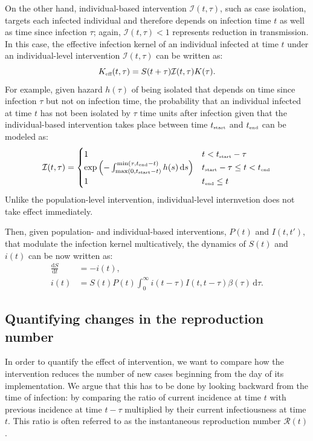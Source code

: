 \documentclass[12pt]{article}
\newcommand{\RR}{\ensuremath{{\mathcal R}}\xspace}
\newcommand{\tsub}[2]{#1_{{\textrm{\tiny #2}}}}
\newcommand{\dd}[1]{\ensuremath{\, \mathrm{d}#1}}
\newcommand{\dtau}{\dd{\tau}}
\newcommand{\tstart}{\ensuremath{\tsub{t}{start}}\xspace}
\newcommand{\tend}{\ensuremath{\tsub{t}{end}}\xspace}
\newcommand{\Keff}{\ensuremath{\tsub{K}{eff}}\xspace}
\newcommand{\II}{{\mathcal I}}
\begin{document}
On the other hand, individual-based intervention $\II(t, \tau)$, such as case isolation, targets each infected individual and therefore depends on infection time $t$ as well as time since infection $\tau$; again, $\II(t, \tau) < 1$ represents reduction in transmission.
In this case, the effective infection kernel of an individual infected at time $t$ under an individual-level intervention $\II(t, \tau)$ can be written as:
\begin{equation}
\Keff(t, \tau) = S(t+\tau) \II(t, \tau) K(\tau).
\end{equation}
For example, given hazard $h(\tau)$ of being isolated that depends on time since infection $\tau$ but not on infection time, the probability that an individual infected at time $t$ has not been isolated by $\tau$ time units after infection given that the individual-based intervention takes place between time \tstart and \tend can be modeled as:
\begin{equation}
\II(t, \tau) = \begin{cases}
1 & t < \tstart-\tau \\
\exp\left(- \int_{\max(0, \tstart - t)}^{\min(\tau, \tend-t)} h(s)\dd{s} \right) & \tstart-\tau \leq t < \tend \\
1 & \tend \leq t
\end{cases}
\end{equation}
Unlike the population-level intervention, individual-level internvetion does not take effect immediately.


Then, given population- and individual-based interventions, $P(t)$ and $I(t, t')$, that modulate the infection kernel multicatively, the dynamics of $S(t)$ and $i(t)$ can be now written as:
\begin{equation}
\begin{aligned}
\frac{\mathrm{d}S}{\mathrm{d}t} &= - i(t),\\
i(t) &= S(t) P(t) \int_0^\infty i(t-\tau) I(t,t-\tau) \beta(\tau) \dtau.
\end{aligned}
\end{equation}


\subsection{Quantifying changes in the reproduction number}

In order to quantify the effect of intervention, we want to compare how the intervention reduces the number of new cases beginning from the day of its implementation.
We argue that this has to be done by looking backward from the time of infection: by comparing the ratio of current incidence at time $t$ with previous incidence at time $t-\tau$ multiplied by their current infectiousness at time $t$.
This ratio is often referred to as the instantaneous reproduction number $\RR(t)$.
\end{document}
